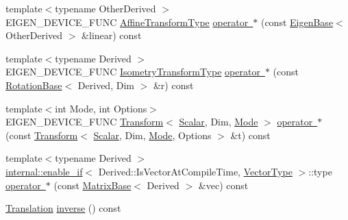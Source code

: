 \begin{DoxyCompactItemize}
\item 
{\footnotesize template$<$typename Other\+Derived $>$ }\\E\+I\+G\+E\+N\+\_\+\+D\+E\+V\+I\+C\+E\+\_\+\+F\+U\+NC \mbox{\hyperlink{class_eigen_1_1_translation_a25c762409320ba9490a0d12c6652bbad}{Affine\+Transform\+Type}} \mbox{\hyperlink{class_eigen_1_1_translation_a4733741b04281588c204d8f183748f2c}{operator $\ast$}} (const \mbox{\hyperlink{struct_eigen_1_1_eigen_base}{Eigen\+Base}}$<$ Other\+Derived $>$ \&linear) const
\item 
{\footnotesize template$<$typename Derived $>$ }\\E\+I\+G\+E\+N\+\_\+\+D\+E\+V\+I\+C\+E\+\_\+\+F\+U\+NC \mbox{\hyperlink{class_eigen_1_1_translation_ad3ac890d85420ba78e16dab1983d1a80}{Isometry\+Transform\+Type}} \mbox{\hyperlink{class_eigen_1_1_translation_a5d5f4e7c7b6219b79760e387b17e099d}{operator $\ast$}} (const \mbox{\hyperlink{class_eigen_1_1_rotation_base}{Rotation\+Base}}$<$ Derived, Dim $>$ \&r) const
\item 
{\footnotesize template$<$int Mode, int Options$>$ }\\E\+I\+G\+E\+N\+\_\+\+D\+E\+V\+I\+C\+E\+\_\+\+F\+U\+NC \mbox{\hyperlink{class_eigen_1_1_transform}{Transform}}$<$ \mbox{\hyperlink{class_eigen_1_1_translation_ad596bf21ced4b902cc242205df486e21}{Scalar}}, Dim, \mbox{\hyperlink{struct_mode}{Mode}} $>$ \mbox{\hyperlink{class_eigen_1_1_translation_a6c25fe3016dd8e3fc213bc1004db2b07}{operator $\ast$}} (const \mbox{\hyperlink{class_eigen_1_1_transform}{Transform}}$<$ \mbox{\hyperlink{class_eigen_1_1_translation_ad596bf21ced4b902cc242205df486e21}{Scalar}}, Dim, \mbox{\hyperlink{struct_mode}{Mode}}, Options $>$ \&t) const
\item 
{\footnotesize template$<$typename Derived $>$ }\\\mbox{\hyperlink{struct_eigen_1_1internal_1_1enable__if}{internal\+::enable\+\_\+if}}$<$ Derived\+::\+Is\+Vector\+At\+Compile\+Time, \mbox{\hyperlink{class_eigen_1_1_translation_a339e17dfec5394ae563f62cca0df451f}{Vector\+Type}} $>$\+::type \mbox{\hyperlink{class_eigen_1_1_translation_a11f1bd7eb645d784d7c8f9cb6faa25a6}{operator $\ast$}} (const \mbox{\hyperlink{class_eigen_1_1_matrix_base}{Matrix\+Base}}$<$ Derived $>$ \&vec) const
\item 
\mbox{\hyperlink{class_eigen_1_1_translation}{Translation}} \mbox{\hyperlink{class_eigen_1_1_translation_aa72ee6bccce7f26cbef57550308e6aaf}{inverse}} () const
\item 
\mbox{\label{class_eigen_1_1_translation_a8c3e097c4a9e46b802f03e85031599f3}} 

\end{DoxyCompactItemize}
